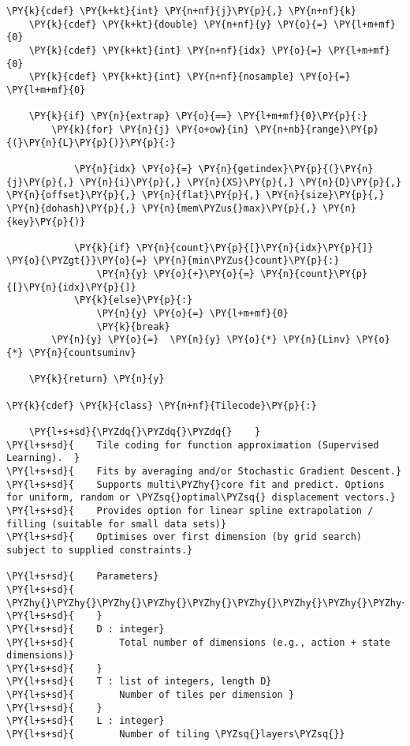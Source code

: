 \begin{Verbatim}[commandchars=\\\{\}]
    \PY{k}{cdef} \PY{k+kt}{int} \PY{n+nf}{j}\PY{p}{,} \PY{n+nf}{k}
    \PY{k}{cdef} \PY{k+kt}{double} \PY{n+nf}{y} \PY{o}{=} \PY{l+m+mf}{0}
    \PY{k}{cdef} \PY{k+kt}{int} \PY{n+nf}{idx} \PY{o}{=} \PY{l+m+mf}{0}
    \PY{k}{cdef} \PY{k+kt}{int} \PY{n+nf}{nosample} \PY{o}{=} \PY{l+m+mf}{0}

    \PY{k}{if} \PY{n}{extrap} \PY{o}{==} \PY{l+m+mf}{0}\PY{p}{:}
        \PY{k}{for} \PY{n}{j} \PY{o+ow}{in} \PY{n+nb}{range}\PY{p}{(}\PY{n}{L}\PY{p}{)}\PY{p}{:} 
        
            \PY{n}{idx} \PY{o}{=} \PY{n}{getindex}\PY{p}{(}\PY{n}{j}\PY{p}{,} \PY{n}{i}\PY{p}{,} \PY{n}{XS}\PY{p}{,} \PY{n}{D}\PY{p}{,} \PY{n}{offset}\PY{p}{,} \PY{n}{flat}\PY{p}{,} \PY{n}{size}\PY{p}{,} \PY{n}{dohash}\PY{p}{,} \PY{n}{mem\PYZus{}max}\PY{p}{,} \PY{n}{key}\PY{p}{)}
           
            \PY{k}{if} \PY{n}{count}\PY{p}{[}\PY{n}{idx}\PY{p}{]} \PY{o}{\PYZgt{}}\PY{o}{=} \PY{n}{min\PYZus{}count}\PY{p}{:}
                \PY{n}{y} \PY{o}{+}\PY{o}{=} \PY{n}{count}\PY{p}{[}\PY{n}{idx}\PY{p}{]}
            \PY{k}{else}\PY{p}{:}
                \PY{n}{y} \PY{o}{=} \PY{l+m+mf}{0}
                \PY{k}{break}
        \PY{n}{y} \PY{o}{=}  \PY{n}{y} \PY{o}{*} \PY{n}{Linv} \PY{o}{*} \PY{n}{countsuminv}
    
    \PY{k}{return} \PY{n}{y}
    
\PY{k}{cdef} \PY{k}{class} \PY{n+nf}{Tilecode}\PY{p}{:}
    
    \PY{l+s+sd}{\PYZdq{}\PYZdq{}\PYZdq{}    }
\PY{l+s+sd}{    Tile coding for function approximation (Supervised Learning).  }
\PY{l+s+sd}{    Fits by averaging and/or Stochastic Gradient Descent.}
\PY{l+s+sd}{    Supports multi\PYZhy{}core fit and predict. Options for uniform, random or \PYZsq{}optimal\PYZsq{} displacement vectors.}
\PY{l+s+sd}{    Provides option for linear spline extrapolation / filling (suitable for small data sets)}
\PY{l+s+sd}{    Optimises over first dimension (by grid search) subject to supplied constraints.}

\PY{l+s+sd}{    Parameters}
\PY{l+s+sd}{    \PYZhy{}\PYZhy{}\PYZhy{}\PYZhy{}\PYZhy{}\PYZhy{}\PYZhy{}\PYZhy{}\PYZhy{}\PYZhy{}\PYZhy{}}
\PY{l+s+sd}{    }
\PY{l+s+sd}{    D : integer}
\PY{l+s+sd}{        Total number of dimensions (e.g., action + state dimensions)}
\PY{l+s+sd}{    }
\PY{l+s+sd}{    T : list of integers, length D}
\PY{l+s+sd}{        Number of tiles per dimension }
\PY{l+s+sd}{    }
\PY{l+s+sd}{    L : integer}
\PY{l+s+sd}{        Number of tiling \PYZsq{}layers\PYZsq{}}


\end{Verbatim}
